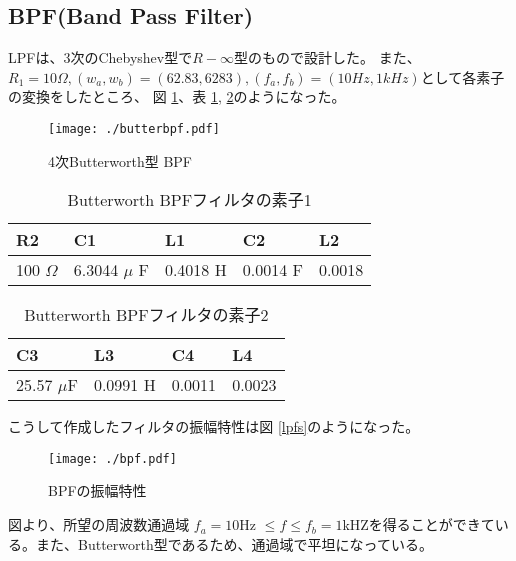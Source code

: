 \documentclass[a4j,twocolumn]{jsarticle}
\begin{document}
\subsection{BPF(Band Pass Filter)}
LPFは、3次のChebyshev型で$R-\infty 型$のもので設計した。
また、$R_{1} = 10\Omega, (w_{a}, w_{b}) = (62.83, 6283) , (f_{a} ,f_{b}) = (10Hz, 1kHz)$として各素子の変換をしたところ、
図 \ref{bpf}、表 \ref{bpfhyou1}, \ref{bpfhyou2}のようになった。
\begin{figure}[H]
    \centering
   \texttt{[image: ./butterbpf.pdf]}
   \caption{4次Butterworth型 BPF}
    \label{bpf}
\end{figure}
\begin{table}
    \centering
    \caption{Butterworth BPFフィルタの素子1}
    \begin{tabular}{@{}lllll@{}} \toprule
    R2 & C1 & L1 & C2 & L2 \\ \midrule
    100 $\Omega$ & 6.3044 $\mu$ F & 0.4018 H & 0.0014 F & 0.0018\\ \bottomrule
    \end{tabular} 
    \label{bpfhyou1}
\end{table}
\begin{table}
    \centering
    \caption{Butterworth BPFフィルタの素子2}
    \begin{tabular}{@{}llll@{}} \toprule
    C3 & L3 & C4 & L4   \\ \midrule
    25.57 $\mu$F & 0.0991 H & 0.0011 & 0.0023 \\ \bottomrule
    \end{tabular} 
    \label{bpfhyou2}
\end{table}
こうして作成したフィルタの振幅特性は図 \ref{lpfs}のようになった。
\begin{figure}[H]
    \centering
   \texttt{[image: ./bpf.pdf]}
   \caption{BPFの振幅特性}
    \label{bpfs}
\end{figure}
図より、所望の周波数通過域 $f_{a} = 10$Hz $\leq f \leq f_{b} = 1$kHZを得ることができている。また、Butterworth型であるため、通過域で平坦になっている。
\end{document}
